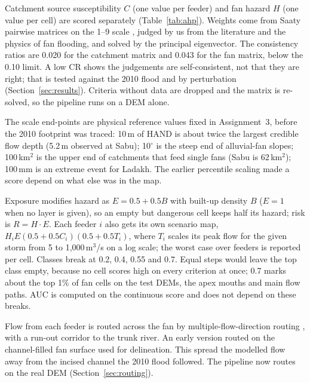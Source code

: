 \documentclass[sigconf,nonacm]{acmart}
\begin{document}
Catchment source susceptibility $C$ (one value per feeder) and fan hazard $H$ (one value per cell) are scored separately (Table~\ref{tab:ahp}). Weights come from Saaty pairwise matrices on the 1--9 scale \cite{saaty1980}, judged by us from the literature and the physics of fan flooding, and solved by the principal eigenvector. The consistency ratios are 0.020 for the catchment matrix and 0.043 for the fan matrix, below the 0.10 limit. A low CR shows the judgements are self-consistent, not that they are right; that is tested against the 2010 flood and by perturbation (Section~\ref{sec:results}). Criteria without data are dropped and the matrix is re-solved, so the pipeline runs on a DEM alone.

The scale end-points are physical reference values fixed in Assignment~3, before the 2010 footprint was traced: 10\,m of HAND is about twice the largest credible flow depth (5.2\,m observed at Sabu); 10$^\circ$ is the steep end of alluvial-fan slopes; 100\,km$^2$ is the upper end of catchments that feed single fans (Sabu is 62\,km$^2$); 100\,mm is an extreme event for Ladakh. The earlier percentile scaling made a score depend on what else was in the map.

Exposure modifies hazard as $E = 0.5 + 0.5B$ with built-up density $B$ ($E = 1$ when no layer is given), so an empty but dangerous cell keeps half its hazard; risk is $R = H \cdot E$. Each feeder $i$ also gets its own scenario map, $H_i E (0.5 + 0.5C_i)(0.5 + 0.5T_i)$, where $T_i$ scales its peak flow for the given storm from 5 to 1,000\,m$^3$/s on a log scale; the worst case over feeders is reported per cell. Classes break at 0.2, 0.4, 0.55 and 0.7. Equal steps would leave the top class empty, because no cell scores high on every criterion at once; 0.7 marks about the top 1\% of fan cells on the test DEMs, the apex mouths and main flow paths. AUC is computed on the continuous score and does not depend on these breaks.

Flow from each feeder is routed across the fan by multiple-flow-direction routing \cite{holmgren1994}, with a run-out corridor to the trunk river. An early version routed on the channel-filled fan surface used for delineation. This spread the modelled flow away from the incised channel the 2010 flood followed. The pipeline now routes on the real DEM (Section~\ref{sec:routing}).
\end{document}

